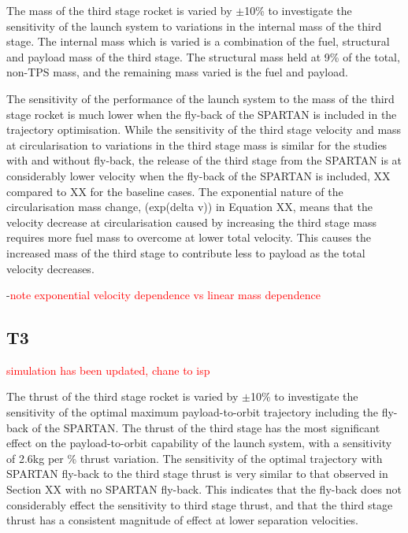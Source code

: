 The mass of the third stage rocket is varied by $\pm$10\% to investigate the sensitivity of the launch system to variations in the internal mass of the third stage. The internal mass which is varied is a combination of the fuel, structural and payload mass of the third stage. The structural mass held at 9\% of the total, non-TPS mass, and the remaining mass varied is the fuel and payload.

The sensitivity of the performance of the launch system to the mass of the third stage rocket is much lower when the fly-back of the SPARTAN is included in the trajectory optimisation. 
While the sensitivity of the third stage velocity and mass at circularisation to variations in the third stage mass is similar for the studies with and without fly-back, the release of the third stage from the SPARTAN is at considerably lower velocity when the fly-back of the SPARTAN is included, XX compared to XX for the baseline cases. 
The exponential nature of the circularisation mass change, (exp(delta v)) in Equation XX, means that the velocity decrease at circularisation caused by increasing the third stage mass requires more fuel mass to overcome at lower total velocity. This causes the increased mass of the third stage to contribute less to payload as the total velocity decreases. 


-\textcolor{red}{note exponential velocity dependence vs linear mass dependence}

\subsection{T3}

\textcolor{red}{simulation has been updated, chane to isp}

The thrust of the third stage rocket is varied by $\pm$10\% to investigate the sensitivity of the optimal maximum payload-to-orbit trajectory including the fly-back of the SPARTAN. 
The thrust of the third stage has the most significant effect on the payload-to-orbit capability of the launch system, with a sensitivity of 2.6kg per \% thrust variation. 
The sensitivity of the optimal trajectory with SPARTAN fly-back to the third stage thrust is very similar to that observed in Section XX with no SPARTAN fly-back. This indicates that the fly-back does not considerably effect the sensitivity to third stage thrust, and that the third stage thrust has a consistent magnitude of effect at lower separation velocities. 


